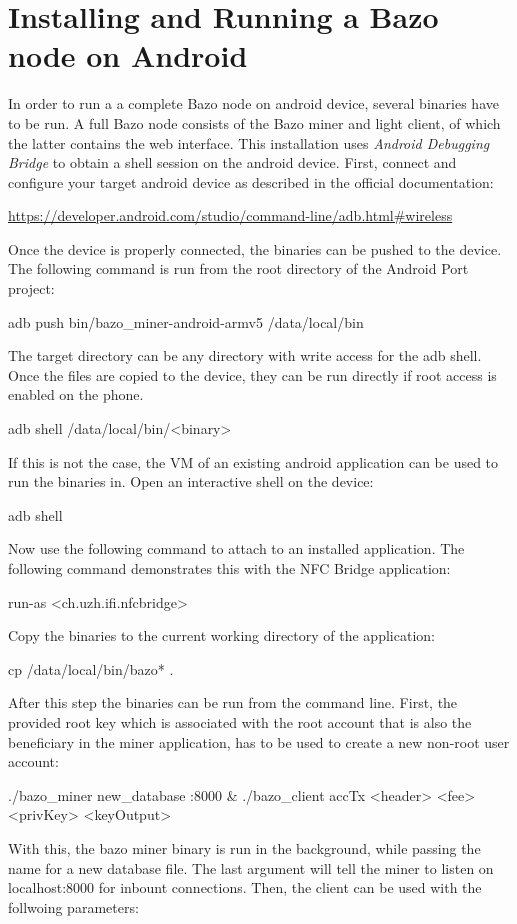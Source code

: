 \section{Installing and Running a Bazo node on Android}
In order to run a a complete Bazo node on android device, several binaries have to be run. A full Bazo node consists of the Bazo miner and light client, of which the latter contains the web interface.
This installation uses \textit{Android Debugging Bridge} to obtain a shell session on the android device. First, connect and configure your target android device as described in the official documentation:
\begin{framed}\url{https://developer.android.com/studio/command-line/adb.html#wireless}
\end{framed}
Once the device is properly connected, the binaries can be pushed to the device. The following command is run from the root directory of the Android Port project:
\begin{framed}adb push bin/bazo\_miner-android-armv5 /data/local/bin\end{framed}
The target directory can be any directory with write access for the adb shell. Once the files are copied to the device, they can be run directly if root access is enabled on the phone.
\begin{framed}adb shell /data/local/bin/<binary>\end{framed}
If this is not the case, the VM of an existing android application can be used to run the binaries in. Open an interactive shell on the device:
\begin{framed}adb shell\end{framed}
Now use the following command to attach to an installed application. The following command demonstrates this with the NFC Bridge application:
\begin{framed}run-as <ch.uzh.ifi.nfcbridge>\end{framed}
Copy the binaries to the current working directory of the application:
\begin{framed}cp /data/local/bin/bazo* .\end{framed}
After this step the binaries can be run from the command line. 
First, the provided root key which is associated with the root account that is also the beneficiary in the miner application, has to be used to create a new non-root user account:
\begin{framed}./bazo\_miner new\_database :8000 \&
./bazo\_client accTx <header> <fee> <privKey> <keyOutput>
\end{framed}
With this, the bazo miner binary is run in the background, while passing the name for a new database file. The last argument will tell the miner to listen on localhost:8000 for inbount connections. Then, the client can be used with the follwoing parameters:

